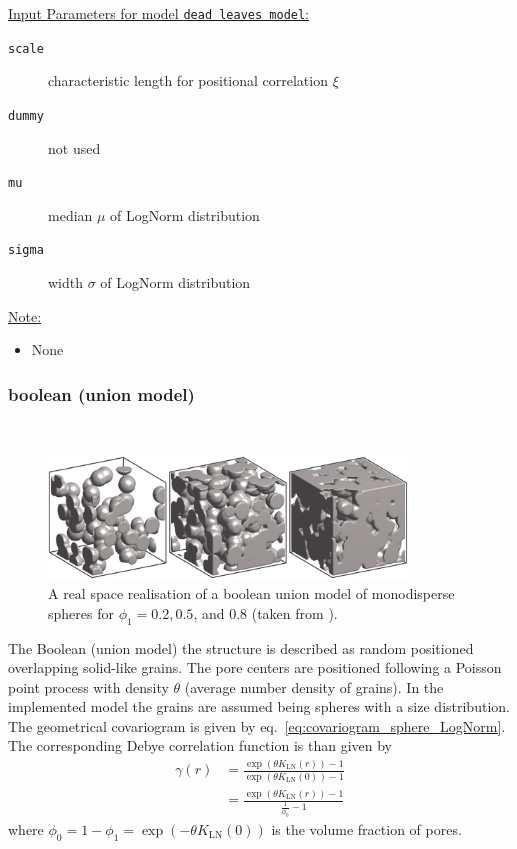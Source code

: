 \uline{Input Parameters for model \texttt{dead leaves model}:}\\
\begin{description}
\item[\texttt{scale}] characteristic length for positional correlation $\xi$
\item[\texttt{dummy}] not used
\item[\texttt{mu}] median $\mu$ of LogNorm distribution
\item[\texttt{sigma}] width $\sigma$ of LogNorm distribution
\end{description}

\vspace{5mm}

\uline{Note:}
\begin{itemize}
\item None
\end{itemize}


\newpage
\subsubsection{boolean (union model)}~\\

\begin{figure}[htb]
\begin{center}
\includegraphics[width=0.85\textwidth]{../images/form_factor/nonparticular/boolean_union_3D.png}
\end{center}
\caption{A real space realisation of a boolean union model of monodisperse spheres for $\phi_1=0.2, 0.5$, and 0.8 (taken from \cite{Gommes2018}).} \label{fig:BooleanUnion3D}
\end{figure}

The Boolean (union model) the structure is described as random positioned overlapping solid-like grains. The pore centers are positioned following a Poisson point process with density $\theta$ (average number density of grains). In the implemented model the grains are assumed being spheres with a size distribution. The geometrical covariogram is given by eq.\ \ref{eq:covariogram_sphere_LogNorm}. The corresponding Debye correlation function is than given by
\begin{align}\label{eq:Debye_correlation_function_boolean_union}
  \gamma(r) &= \frac{\exp\left(\theta K_\mathrm{LN}(r)\right)-1}{\exp\left(\theta K_\mathrm{LN}(0)\right)-1} \\
            &= \frac{\exp\left(\theta K_\mathrm{LN}(r)\right)-1}{\frac{1}{\phi_0}-1}
\end{align}
where $\phi_0=1-\phi_1=\exp(-\theta K_\mathrm{LN}(0))$ is the volume fraction of pores.

